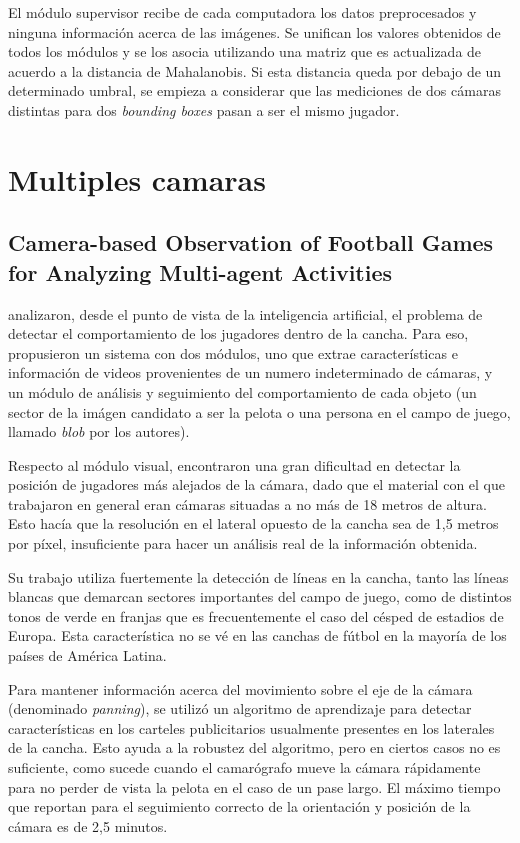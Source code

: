 \documentclass[a4paper,10pt]{article}
\begin{document}
El módulo supervisor recibe de cada computadora los datos preprocesados y ninguna información
acerca de las imágenes. Se unifican los valores obtenidos de todos los módulos y se los asocia
utilizando una matriz que es actualizada de acuerdo a la distancia de Mahalanobis. Si esta
distancia queda por debajo de un determinado umbral, se empieza a considerar que las mediciones
de dos cámaras distintas para dos \textit{bounding boxes} pasan a ser el mismo jugador.

\section{Multiples camaras}

\subsection{Camera-based Observation of Football Games for Analyzing Multi-agent Activities}

\citeauthor*{beetz-05, beetz-06} analizaron, desde el punto de vista de la inteligencia artificial,
el problema de detectar el comportamiento de los jugadores dentro de la cancha. Para eso, propusieron
un sistema con dos módulos, uno que extrae características e información de videos provenientes de
un numero indeterminado de cámaras, y un módulo de análisis y seguimiento del comportamiento de cada
objeto (un sector de la imágen candidato a ser la pelota o una persona en el campo de juego, 
llamado \textit{blob} por los autores).

Respecto al módulo visual, encontraron una gran dificultad en detectar la posición de jugadores más alejados
de la cámara, dado que el material con el que trabajaron en general eran cámaras situadas a no más de
18 metros de altura. Esto hacía que la resolución en el lateral opuesto de la cancha sea de 1,5 metros por píxel,
insuficiente para hacer un análisis real de la información obtenida.

Su trabajo utiliza fuertemente la detección de líneas en la cancha, tanto las líneas blancas que demarcan sectores
importantes del campo de juego, como de distintos tonos de verde en franjas que es frecuentemente el caso del césped de
estadios de Europa. Esta característica no se vé en las canchas de fútbol en la mayoría de los países de América Latina.

Para mantener información acerca del movimiento sobre el eje de la cámara (denominado \textit{panning}), se utilizó
un algoritmo de aprendizaje para detectar características en los carteles publicitarios usualmente presentes en los
laterales de la cancha. Esto ayuda a la robustez del algoritmo, pero en ciertos casos no es suficiente, como sucede
cuando el camarógrafo mueve la cámara rápidamente para no perder de vista la pelota en el caso de un pase largo.
El máximo tiempo que reportan para el seguimiento correcto de la orientación y posición de la cámara es de 2,5 minutos.
\end{document}
